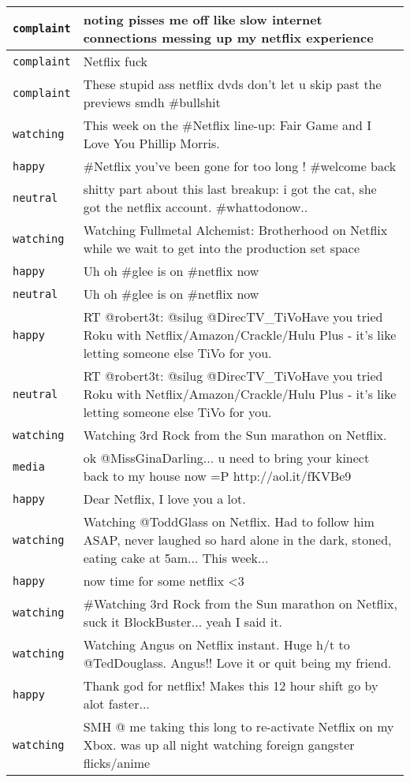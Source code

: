{\begin{longtable}{|l|p{160mm}|}
      \tabularnewline\hline
         \texttt{complaint} & noting pisses me off like slow internet connections messing up my netflix experience
      \tabularnewline\hline
         \texttt{complaint} & Netflix fuck
      \tabularnewline\hline
         \texttt{complaint} & These stupid ass netflix dvds don't let u skip past the previews smdh \#bullshit
      \tabularnewline\hline
         \texttt{watching} & This week on the \#Netflix line-up: Fair Game and I Love You Phillip Morris.
      \tabularnewline\hline
         \texttt{happy} & \#Netflix you've been gone for too long ! \#welcome back
      \tabularnewline\hline
         \texttt{neutral} & shitty part about this last breakup: i got the cat, she got the netflix account. \#whattodonow..
      \tabularnewline\hline
         \texttt{watching} & Watching Fullmetal Alchemist: Brotherhood on Netflix while we wait to get into the production set space
      \tabularnewline\hline
         \texttt{happy} & Uh oh \#glee is on \#netflix now
      \tabularnewline\hline
         \texttt{neutral} & Uh oh \#glee is on \#netflix now
      \tabularnewline\hline
         \texttt{happy} & RT @robert3t: @silug @DirecTV\_TiVoHave you tried Roku with Netflix/Amazon/Crackle/Hulu Plus - it's like letting someone else TiVo for you.
      \tabularnewline\hline
         \texttt{neutral} & RT @robert3t: @silug @DirecTV\_TiVoHave you tried Roku with Netflix/Amazon/Crackle/Hulu Plus - it's like letting someone else TiVo for you.
      \tabularnewline\hline
         \texttt{watching} & Watching 3rd Rock from the Sun marathon on Netflix.
      \tabularnewline\hline
         \texttt{media} & ok @MissGinaDarling... u need to bring your kinect back to my house now =P http://aol.it/fKVBe9
      \tabularnewline\hline
         \texttt{happy} & Dear Netflix, I love you a lot.
      \tabularnewline\hline
         \texttt{watching} & Watching @ToddGlass on Netflix. Had to follow him ASAP, never laughed so hard alone in the dark, stoned, eating cake at 5am... This week...
      \tabularnewline\hline
         \texttt{happy} & now time for some netflix <3
      \tabularnewline\hline
         \texttt{watching} & \#Watching 3rd Rock from the Sun marathon on Netflix, suck it BlockBuster... yeah I said it.
      \tabularnewline\hline
         \texttt{watching} & Watching Angus on Netflix instant. Huge h/t to @TedDouglass. Angus!! Love it or quit being my friend.
      \tabularnewline\hline
         \texttt{happy} & Thank god for netflix! Makes this 12 hour shift go by alot faster...
      \tabularnewline\hline
         \texttt{watching} & SMH @ me taking this long to re-activate Netflix on my Xbox. was up all night watching foreign gangster flicks/anime

\end{longtable}}
